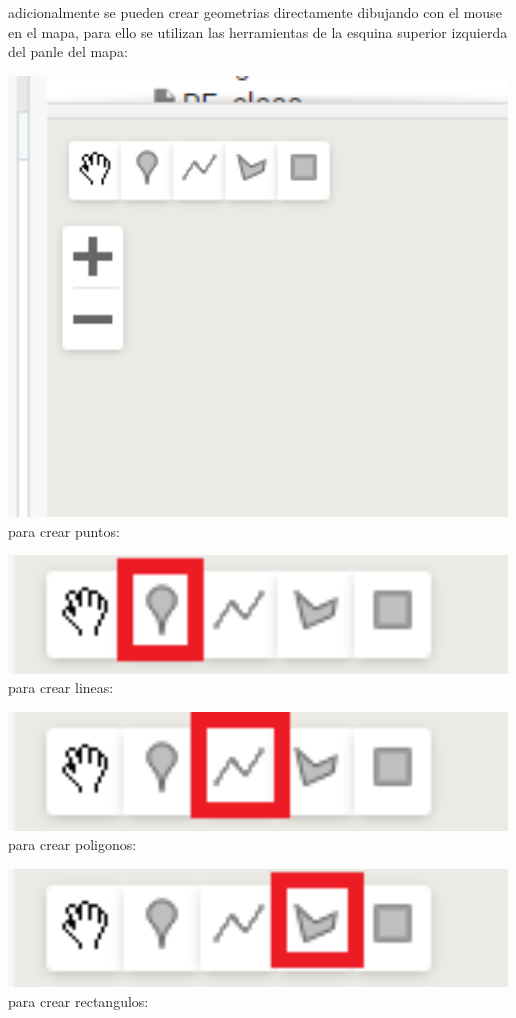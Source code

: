\documentclass[
]{article}
\begin{document}
\begin{tipblock}
adicionalmente se pueden crear geometrias directamente dibujando con el
mouse en el mapa, para ello se utilizan las herramientas de la esquina
superior izquierda del panle del mapa:

\includegraphics[width=500px]{Img/geometrias} para crear puntos:

\includegraphics[width=500px]{Img/punto} para crear lineas:

\includegraphics[width=500px]{Img/linea} para crear poligonos:

\includegraphics[width=500px]{Img/poligono} para crear rectangulos:


\end{tipblock}
\end{document}
